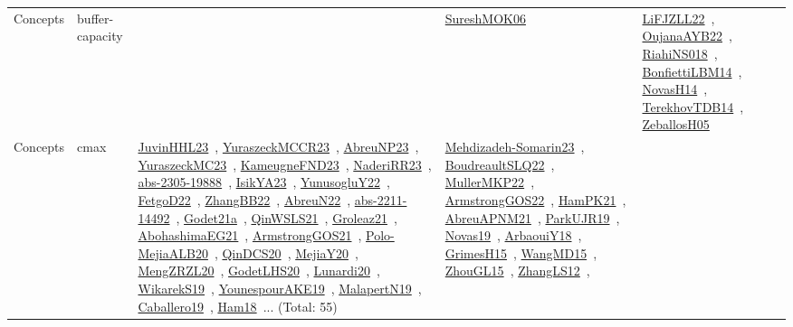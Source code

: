 {\begin{longtable}{lp{3cm}>{\raggedright\arraybackslash}p{6cm}>{\raggedright\arraybackslash}p{6cm}>{\raggedright\arraybackslash}p{8cm}}
Concepts & buffer-capacity &  & \href{works/SureshMOK06.pdf}{SureshMOK06}~\cite{SureshMOK06} & \href{works/LiFJZLL22.pdf}{LiFJZLL22}~\cite{LiFJZLL22}, \href{works/OujanaAYB22.pdf}{OujanaAYB22}~\cite{OujanaAYB22}, \href{works/RiahiNS018.pdf}{RiahiNS018}~\cite{RiahiNS018}, \href{works/BonfiettiLBM14.pdf}{BonfiettiLBM14}~\cite{BonfiettiLBM14}, \href{works/NovasH14.pdf}{NovasH14}~\cite{NovasH14}, \href{works/TerekhovTDB14.pdf}{TerekhovTDB14}~\cite{TerekhovTDB14}, \href{works/ZeballosH05.pdf}{ZeballosH05}~\cite{ZeballosH05}\\
Concepts & cmax & \href{works/JuvinHHL23.pdf}{JuvinHHL23}~\cite{JuvinHHL23}, \href{works/YuraszeckMCCR23.pdf}{YuraszeckMCCR23}~\cite{YuraszeckMCCR23}, \href{works/AbreuNP23.pdf}{AbreuNP23}~\cite{AbreuNP23}, \href{works/YuraszeckMC23.pdf}{YuraszeckMC23}~\cite{YuraszeckMC23}, \href{works/KameugneFND23.pdf}{KameugneFND23}~\cite{KameugneFND23}, \href{works/NaderiRR23.pdf}{NaderiRR23}~\cite{NaderiRR23}, \href{works/abs-2305-19888.pdf}{abs-2305-19888}~\cite{abs-2305-19888}, \href{works/IsikYA23.pdf}{IsikYA23}~\cite{IsikYA23}, \href{works/YunusogluY22.pdf}{YunusogluY22}~\cite{YunusogluY22}, \href{works/FetgoD22.pdf}{FetgoD22}~\cite{FetgoD22}, \href{works/ZhangBB22.pdf}{ZhangBB22}~\cite{ZhangBB22}, \href{works/AbreuN22.pdf}{AbreuN22}~\cite{AbreuN22}, \href{works/abs-2211-14492.pdf}{abs-2211-14492}~\cite{abs-2211-14492}, \href{works/Godet21a.pdf}{Godet21a}~\cite{Godet21a}, \href{works/QinWSLS21.pdf}{QinWSLS21}~\cite{QinWSLS21}, \href{works/Groleaz21.pdf}{Groleaz21}~\cite{Groleaz21}, \href{works/AbohashimaEG21.pdf}{AbohashimaEG21}~\cite{AbohashimaEG21}, \href{works/ArmstrongGOS21.pdf}{ArmstrongGOS21}~\cite{ArmstrongGOS21}, \href{works/Polo-MejiaALB20.pdf}{Polo-MejiaALB20}~\cite{Polo-MejiaALB20}, \href{works/QinDCS20.pdf}{QinDCS20}~\cite{QinDCS20}, \href{works/MejiaY20.pdf}{MejiaY20}~\cite{MejiaY20}, \href{works/MengZRZL20.pdf}{MengZRZL20}~\cite{MengZRZL20}, \href{works/GodetLHS20.pdf}{GodetLHS20}~\cite{GodetLHS20}, \href{works/Lunardi20.pdf}{Lunardi20}~\cite{Lunardi20}, \href{works/WikarekS19.pdf}{WikarekS19}~\cite{WikarekS19}, \href{works/YounespourAKE19.pdf}{YounespourAKE19}~\cite{YounespourAKE19}, \href{works/MalapertN19.pdf}{MalapertN19}~\cite{MalapertN19}, \href{works/Caballero19.pdf}{Caballero19}~\cite{Caballero19}, \href{works/Ham18.pdf}{Ham18}~\cite{Ham18}... (Total: 55) & \href{works/Mehdizadeh-Somarin23.pdf}{Mehdizadeh-Somarin23}~\cite{Mehdizadeh-Somarin23}, \href{works/BoudreaultSLQ22.pdf}{BoudreaultSLQ22}~\cite{BoudreaultSLQ22}, \href{works/MullerMKP22.pdf}{MullerMKP22}~\cite{MullerMKP22}, \href{works/ArmstrongGOS22.pdf}{ArmstrongGOS22}~\cite{ArmstrongGOS22}, \href{works/HamPK21.pdf}{HamPK21}~\cite{HamPK21}, \href{works/AbreuAPNM21.pdf}{AbreuAPNM21}~\cite{AbreuAPNM21}, \href{works/ParkUJR19.pdf}{ParkUJR19}~\cite{ParkUJR19}, \href{works/Novas19.pdf}{Novas19}~\cite{Novas19}, \href{works/ArbaouiY18.pdf}{ArbaouiY18}~\cite{ArbaouiY18}, \href{works/GrimesH15.pdf}{GrimesH15}~\cite{GrimesH15}, \href{works/WangMD15.pdf}{WangMD15}~\cite{WangMD15}, \href{works/ZhouGL15.pdf}{ZhouGL15}~\cite{ZhouGL15}, \href{works/ZhangLS12.pdf}{ZhangLS12}~\cite{ZhangLS12}, 
\end{longtable}}
